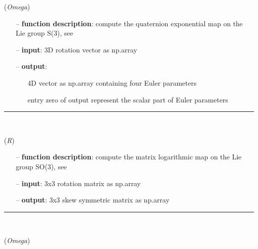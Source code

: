 \begin{itemize}[leftmargin=1.4cm]
\begin{itemize}[leftmargin=0.5cm]
\begin{itemize}[leftmargin=1.4cm]
\begin{itemize}[leftmargin=0.5cm]
\begin{itemize}[leftmargin=1.4cm]
\begin{itemize}[leftmargin=0.5cm]
\begin{itemize}[leftmargin=1.4cm]
\begin{itemize}[leftmargin=1.4cm]
\begin{itemize}[leftmargin=1.4cm]
\begin{itemize}[leftmargin=1.4cm]
\begin{itemize}[leftmargin=0.5cm]
\begin{flushleft}
({\it Omega})
\end{flushleft}
\setlength{\itemindent}{0.7cm}
\begin{itemize}[leftmargin=0.7cm]
  \item[--]  {\bf function description}: compute the quaternion exponential map on the Lie group S(3), see \cite{Terze2016, Mueller2017}  \item[--]  {\bf input}: 3D rotation vector as np.array  \item[--]  {\bf output}: \vspace{-6pt}
  \begin{itemize}[leftmargin=1.2cm]
\setlength{\itemindent}{-0.7cm}
    \item[] 4D vector as np.array containing four Euler parameters
    \item[]           entry zero of output represent the scalar part of Euler parameters
  \end{itemize}
\vspace{12pt}\end{itemize}
%
\noindent\rule{8cm}{0.75pt}\vspace{1pt} \\ 
\begin{flushleft}
\label{sec:lieGroupBasics:LogSO3}
({\it R})
\end{flushleft}
\setlength{\itemindent}{0.7cm}
\begin{itemize}[leftmargin=0.7cm]
  \item[--]  {\bf function description}: compute the matrix logarithmic map on the Lie group SO(3), see \cite{Sonneville2014, Sonneville2017}  \item[--]  {\bf input}: 3x3 rotation matrix as np.array  \item[--]  {\bf output}: 3x3 skew symmetric matrix as np.array\vspace{12pt}\end{itemize}
%
\noindent\rule{8cm}{0.75pt}\vspace{1pt} \\ 
\begin{flushleft}
\label{sec:lieGroupBasics:TExpSO3}
({\it Omega})
\end{flushleft}
\setlength{\itemindent}{0.7cm}
\begin{itemize}[leftmargin=0.7cm]

\end{itemize}
\end{itemize}
\end{itemize}
\end{itemize}
\end{itemize}
\end{itemize}
\end{itemize}
\end{itemize}
\end{itemize}
\end{itemize}
\end{itemize}
\end{itemize}
